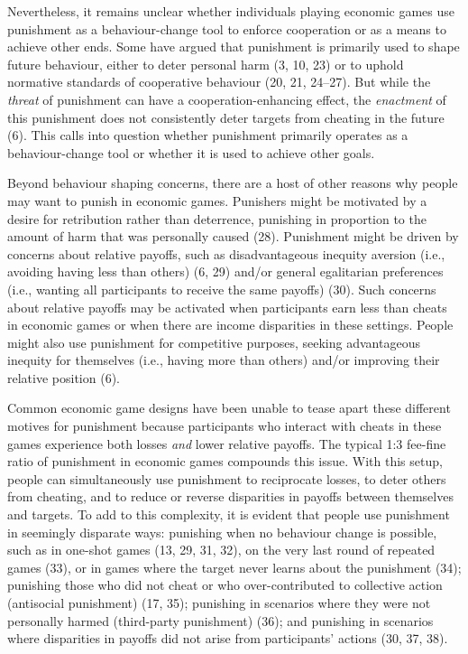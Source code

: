 \documentclass[
  english,
  man, donotrepeattitle,floatsintext]{apa6}
\begin{document}
Nevertheless, it remains unclear whether individuals playing economic games use
punishment as a behaviour-change tool to enforce cooperation or as a means to
achieve other ends. Some have argued that punishment is primarily used to shape
future behaviour, either to deter personal harm (3, 10, 23) or to uphold normative standards of cooperative behaviour
(20, 21, 24--27).
But while the \emph{threat} of punishment can have a cooperation-enhancing effect,
the \emph{enactment} of this punishment does not consistently deter targets from
cheating in the future (6). This calls into question whether
punishment primarily operates as a behaviour-change tool or whether it is used
to achieve other goals.

Beyond behaviour shaping concerns, there are a host of other reasons why people
may want to punish in economic games. Punishers might be motivated by a desire
for retribution rather than deterrence, punishing in proportion to the amount
of harm that was personally caused (28). Punishment might be driven
by concerns about relative payoffs, such as disadvantageous inequity aversion
(i.e., avoiding having less than others) (6, 29) and/or
general egalitarian preferences (i.e., wanting all participants to receive the
same payoffs) (30). Such concerns about relative payoffs may be activated
when participants earn less than cheats in economic games or when there are
income disparities in these settings. People might also use punishment for
competitive purposes, seeking advantageous inequity for themselves (i.e., having
more than others) and/or improving their relative position (6).

Common economic game designs have been unable to tease apart these different
motives for punishment because participants who interact with cheats in these
games experience both losses \emph{and} lower relative payoffs. The typical 1:3
fee-fine ratio of punishment in economic games compounds this issue. With
this setup, people can simultaneously use punishment to reciprocate losses, to
deter others from cheating, and to reduce or reverse disparities in payoffs
between themselves and targets. To add to this complexity, it is evident that
people use punishment in seemingly disparate ways: punishing when no behaviour
change is possible, such as in one-shot games (13, 29, 31, 32), on the very last round of repeated games
(33), or in games where the target never learns about the
punishment (34); punishing those who did not cheat or who
over-contributed to collective action (antisocial punishment)
(17, 35); punishing in scenarios where they were not
personally harmed (third-party punishment) (36); and punishing in
scenarios where disparities in payoffs did not arise from participants'
actions (30, 37, 38).
\end{document}
